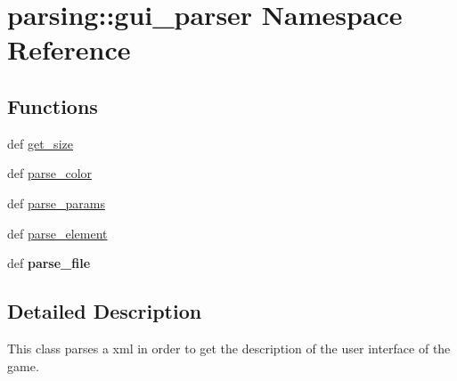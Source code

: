 \hypertarget{namespaceparsing_1_1gui__parser}{\section{parsing\-:\-:gui\-\_\-parser \-Namespace \-Reference}
\label{namespaceparsing_1_1gui__parser}
}
\subsection*{\-Functions}
\begin{DoxyCompactItemize}
\item 
def \hyperlink{namespaceparsing_1_1gui__parser_a25572b97a3f8a66c843f6420dc6dd262}{get\-\_\-size}
\item 
def \hyperlink{namespaceparsing_1_1gui__parser_ad72337cacf2f3e9501df4e5a83c0f8fb}{parse\-\_\-color}
\item 
def \hyperlink{namespaceparsing_1_1gui__parser_ad6d572c3df779eee789ef558d05a3e7a}{parse\-\_\-params}
\item 
def \hyperlink{namespaceparsing_1_1gui__parser_a8e7643d479289d56c10dfbee38dfd996}{parse\-\_\-element}
\item 
\hypertarget{namespaceparsing_1_1gui__parser_a5f4715a8074fb439fa516b23c592ba87}{def {\bfseries parse\-\_\-file}}\label{namespaceparsing_1_1gui__parser_a5f4715a8074fb439fa516b23c592ba87}

\end{DoxyCompactItemize}


\subsection{\-Detailed \-Description}
\begin{DoxyVerb}
This class parses a xml in order to get the description of the user interface
of the game.
\end{DoxyVerb}
 

